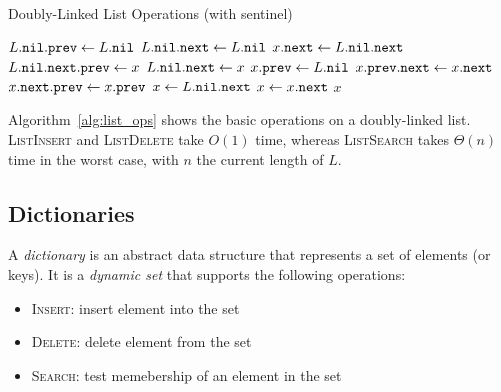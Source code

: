 \begin{algorithm}[htb]
  \caption{Doubly-Linked List Operations (with sentinel)}
  \label{alg:list_ops}
  \begin{algorithmic}[1]
      \State $L\mathtt{.}\mathtt{nil}\mathtt{.}\mathtt{prev} \gets L\mathtt{.}\mathtt{nil}$
      \State $L\mathtt{.}\mathtt{nil}\mathtt{.}\mathtt{next} \gets L\mathtt{.}\mathtt{nil}$
    \EndFunction
     
      \State $x\mathtt{.}\mathtt{next} \gets L\mathtt{.}\mathtt{nil}\mathtt{.}\mathtt{next}$
      \State $L\mathtt{.}\mathtt{nil}\mathtt{.}\mathtt{next}\mathtt{.}\mathtt{prev} \gets x$
      \State $L\mathtt{.}\mathtt{nil}\mathtt{.}\mathtt{next} \gets x$
      \State $x\mathtt{.}\mathtt{prev} \gets L\mathtt{.}\mathtt{nil}$
    \EndFunction
      \State $x\mathtt{.}\mathtt{prev}\mathtt{.}\mathtt{next} \gets x\mathtt{.}\mathtt{next}$
      \State $x\mathtt{.}\mathtt{next}\mathtt{.}\mathtt{prev} \gets x\mathtt{.}\mathtt{prev}$
    \EndFunction
      \State $x \gets L\mathtt{.}\mathtt{nil}\mathtt{.}\mathtt{next}$
        \State $x \gets x\mathtt{.}\mathtt{next}$
      \EndWhile
      \State \Return $x$
    \EndFunction
  \end{algorithmic}
\end{algorithm}



Algorithm~\ref{alg:list_ops} shows the basic operations on a doubly-linked list.
\textsc{ListInsert} and \textsc{ListDelete} take \(O(1)\) time,
whereas \textsc{ListSearch} takes \(\Theta(n)\) time in the worst case,
with \(n\) the current length of \(L\).


\subsection{Dictionaries}
\begin{definition}[Dictionary]
\label{def:dictionary}
A \emph{dictionary} is an abstract data structure that represents a set of elements (or keys). 
It is a \emph{dynamic set} that supports the following operations:
\begin{itemize}[before={\parskip=0pt}, nosep]
\item \textsc{Insert}: insert element into the set
\item \textsc{Delete}: delete element from the set
\item \textsc{Search}: test memebership of an element in the set \qedhere
\end{itemize}
\end{definition}

